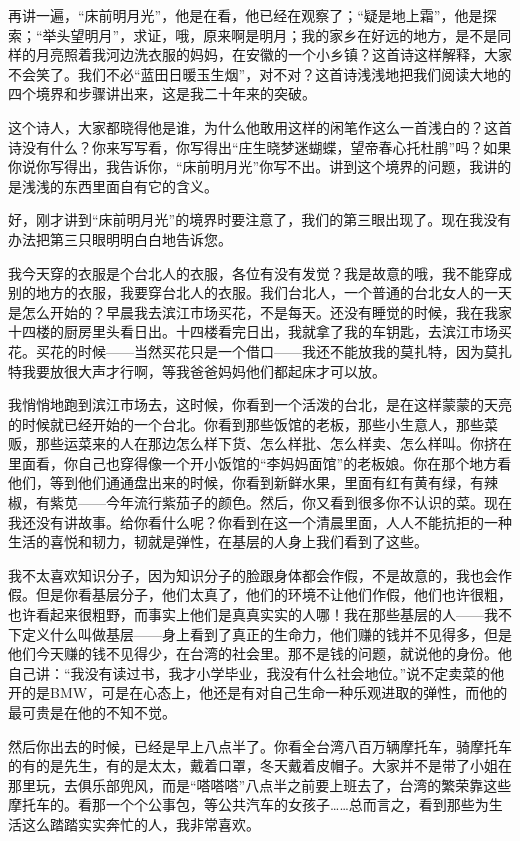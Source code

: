 \par 再讲一遍，“床前明月光”，他是在看，他已经在观察了；“疑是地上霜”，他是探索；“举头望明月”，求证，哦，原来啊是明月；我的家乡在好远的地方，是不是同样的月亮照着我河边洗衣服的妈妈，在安徽的一个小乡镇？这首诗这样解释，大家不会笑了。我们不必“蓝田日暖玉生烟”，对不对？这首诗浅浅地把我们阅读大地的四个境界和步骤讲出来，这是我二十年来的突破。
\par 这个诗人，大家都晓得他是谁，为什么他敢用这样的闲笔作这么一首浅白的？这首诗没有什么？你来写写看，你写得出“庄生晓梦迷蝴蝶，望帝春心托杜鹃”吗？如果你说你写得出，我告诉你，“床前明月光”你写不出。讲到这个境界的问题，我讲的是浅浅的东西里面自有它的含义。
\par 好，刚才讲到“床前明月光”的境界时要注意了，我们的第三眼出现了。现在我没有办法把第三只眼明明白白地告诉您。
\par 我今天穿的衣服是个台北人的衣服，各位有没有发觉？我是故意的哦，我不能穿成别的地方的衣服，我要穿台北人的衣服。我们台北人，一个普通的台北女人的一天是怎么开始的？早晨我去滨江市场买花，不是每天。还没有睡觉的时候，我在我家十四楼的厨房里头看日出。十四楼看完日出，我就拿了我的车钥匙，去滨江市场买花。买花的时候——当然买花只是一个借口——我还不能放我的莫扎特，因为莫扎特我要放很大声才行啊，等我爸爸妈妈他们都起床才可以放。
\par 我悄悄地跑到滨江市场去，这时候，你看到一个活泼的台北，是在这样蒙蒙的天亮的时候就已经开始的一个台北。你看到那些饭馆的老板，那些小生意人，那些菜贩，那些运菜来的人在那边怎么样下货、怎么样批、怎么样卖、怎么样叫。你挤在里面看，你自己也穿得像一个开小饭馆的“李妈妈面馆”的老板娘。你在那个地方看他们，等到他们通通盘出来的时候，你看到新鲜水果，里面有红有黄有绿，有辣椒，有紫苋——今年流行紫茄子的颜色。然后，你又看到很多你不认识的菜。现在我还没有讲故事。给你看什么呢？你看到在这一个清晨里面，人人不能抗拒的一种生活的喜悦和韧力，韧就是弹性，在基层的人身上我们看到了这些。
\par 我不太喜欢知识分子，因为知识分子的脸跟身体都会作假，不是故意的，我也会作假。但是你看基层分子，他们太真了，他们的环境不让他们作假，他们也许很粗，也许看起来很粗野，而事实上他们是真真实实的人哪！我在那些基层的人——我不下定义什么叫做基层——身上看到了真正的生命力，他们赚的钱并不见得多，但是他们今天赚的钱不见得少，在台湾的社会里。那不是钱的问题，就说他的身份。他自己讲：“我没有读过书，我才小学毕业，我没有什么社会地位。”说不定卖菜的他开的是BMW，可是在心态上，他还是有对自己生命一种乐观进取的弹性，而他的最可贵是在他的不知不觉。
\par 然后你出去的时候，已经是早上八点半了。你看全台湾八百万辆摩托车，骑摩托车的有的是先生，有的是太太，戴着口罩，冬天戴着皮帽子。大家并不是带了小姐在那里玩，去俱乐部兜风，而是“嗒嗒嗒”八点半之前要上班去了，台湾的繁荣靠这些摩托车的。看那一个个公事包，等公共汽车的女孩子……总而言之，看到那些为生活这么踏踏实实奔忙的人，我非常喜欢。
